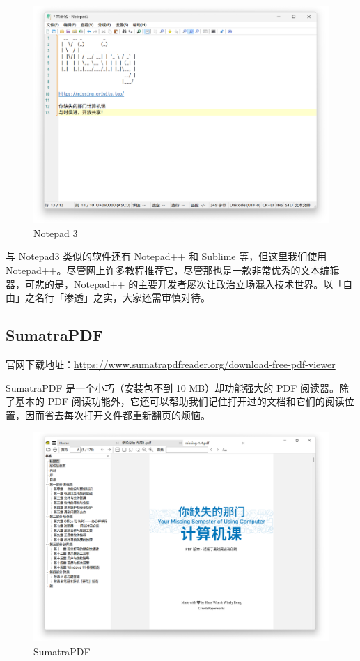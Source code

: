 \begin{figure}[htb!]
  \centering
  \includegraphics[width=.65\textwidth]{assets/software/Notepad3.png}
  \caption{Notepad 3}
  \label{fig:Notepad3}
\end{figure}

与 Notepad3 类似的软件还有 Notepad++ 和 Sublime 等，但这里我们使用 Notepad++。尽管网上许多教程推荐它，尽管那也是一款非常优秀的文本编辑器，可悲的是，Notepad++ 的主要开发者屡次让政治立场混入技术世界。以「自由」之名行「渗透」之实，大家还需审慎对待。

\subsection{SumatraPDF}

官网下载地址：\url{https://www.sumatrapdfreader.org/download-free-pdf-viewer}

SumatraPDF 是一个小巧（安装包不到 10 MB）却功能强大的 PDF 阅读器。除了基本的 PDF 阅读功能外，它还可以帮助我们记住打开过的文档和它们的阅读位置，因而省去每次打开文件都重新翻页的烦恼。

\begin{figure}[htb!]
  \centering
  \includegraphics[width=.75\textwidth]{assets/software/SumatraPDF.png}
  \caption{SumatraPDF}
  \label{fig:SumatraPDF}
\end{figure}

